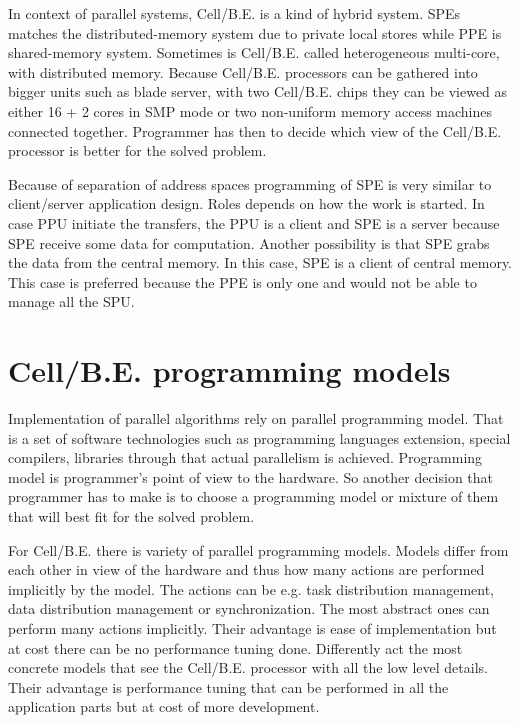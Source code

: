 In context of parallel systems, Cell/B.E. is a kind of hybrid system.
SPEs matches the distributed-memory system due to private local stores while PPE is shared-memory system.
Sometimes is Cell/B.E. called heterogeneous multi-core, with distributed memory.
Because Cell/B.E. processors can be gathered into bigger units such as blade server, with two Cell/B.E. chips they can be viewed as either 16 + 2 cores in SMP mode or two non-uniform memory access machines connected together.
Programmer has then to decide which view of the Cell/B.E. processor is better for the solved problem.

\par
Because of separation of address spaces programming of SPE is very similar to client/server application design.
Roles depends on how the work is started.
In case PPU initiate the transfers, the PPU is a client and SPE is a server because SPE receive some data for computation.
Another possibility is that SPE grabs the data from the central memory.
In this case, SPE is a client of central memory.
This case is preferred because the PPE is only one and would not be able to manage all the SPU.

\section{Cell/B.E. programming models}

\par
Implementation of parallel algorithms rely on parallel programming model.
That is a set of software technologies such as programming languages extension, special compilers, libraries through that actual parallelism is achieved.
Programming model is programmer's point of view to the hardware.
So another decision that programmer has to make is to choose a programming model or mixture of them that will best fit for the solved problem.

\par
For Cell/B.E. there is variety of parallel programming models.
Models differ from each other in view of the hardware and thus how many actions are performed implicitly by the model.
The actions can be e.g. task distribution management, data distribution management or synchronization.
The most abstract ones can perform many actions implicitly.
Their advantage is ease of implementation but at cost there can be no performance tuning done.
Differently act the most concrete models that see the Cell/B.E. processor with all the low level details.
Their advantage is performance tuning that can be performed in all the application parts but at cost of more development.

